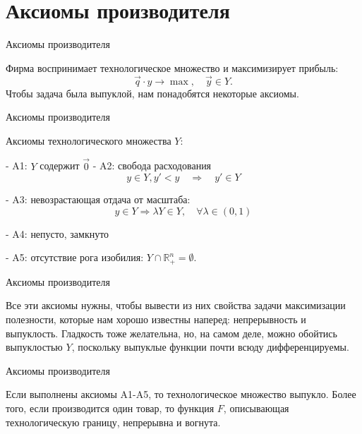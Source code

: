 \documentclass{beamer}
\begin{document}
\section{Аксиомы производителя}

\begin{frame}{Аксиомы производителя}

Фирма воспринимает технологическое множество и максимизирует прибыль:
$$ \vec q \cdot y \to \max, \quad \vec y \in Y.$$
Чтобы задача была выпуклой, нам понадобятся некоторые аксиомы.

\end{frame}

\begin{frame}{Аксиомы производителя}

\begin{definition}
Аксиомы технологического множества $Y$:

- A1: $Y$ содержит $\vec{0}$
- A2: свобода расходования
$$ y \in Y, y' < y \quad \Rightarrow \quad y' \in Y$$

- A3: невозрастающая отдача от масштаба:
$$y \in Y \Rightarrow \lambda Y \in Y, \quad \forall \lambda \in (0,1)$$

- A4: непусто, замкнуто

- A5: отсутствие рога изобилия: $Y \cap \mathbb{R}^n_{+} = \emptyset$.
\end{definition}

\end{frame}

\begin{frame}{Аксиомы производителя}

Все эти аксиомы нужны, чтобы вывести из них свойства задачи максимизации полезности, которые нам хорошо известны наперед: непрерывность и выпуклость. Гладкость тоже желательна, но, на самом деле, можно обойтись выпуклостью $Y$, поскольку выпуклые функции почти всюду дифференцируемы.

\end{frame}

\begin{frame}{Аксиомы производителя}
\begin{theorem}[БЖЦ]

Если выполнены аксиомы A1-A5, то технологическое множество выпукло. Более того, если производится один товар, то функция $F$, описывающая технологическую границу, непрерывна и вогнута.
\end{theorem}

\end{frame}
\end{document}
